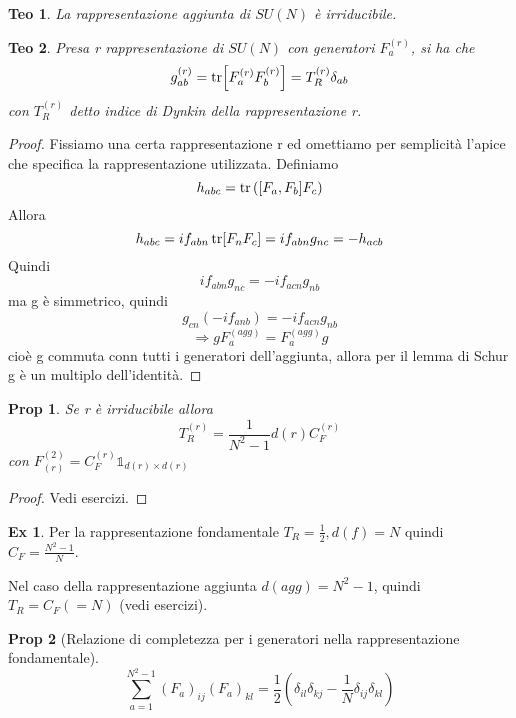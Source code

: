 \documentclass[10pt,a4paper]{article}
\newtheorem{thm}{Teo}[section]
\newtheorem{prop}{Prop}[section]
\theoremstyle{definition}
\newtheorem{example}{Ex}[section]
\begin{document}
\begin{thm}
    La rappresentazione aggiunta di $SU(N)$ è irriducibile.
\end{thm}

\begin{thm}
    Presa r rappresentazione di $SU(N)$ con generatori $F_a^{(r)}$, si ha che
    \[
    g_{ab}^{(r)} = \tr[F_a^{(r)}F_b^{(r)}] =T_R^{(r)}\delta_{ab}    
    \]
    con $T_R^{(r)}$ detto indice di Dynkin della rappresentazione r.
\end{thm}

\begin{proof}
    Fissiamo una certa rappresentazione r ed omettiamo per semplicità l'apice che specifica la rappresentazione utilizzata.
    Definiamo 
    \[
    h_{abc} = \tr\left( [F_a, F_b]F_c \right)    
    \]
    Allora
    \[
    h_{abc} = i f_{abn} \tr[F_n F_c] = i f_{abn}g_{nc} = - h_{acb}    
    \]
    Quindi
    \[
    i f_{abn} g_{nc} = - i f_{acn}g_{nb}    
    \]
    ma g è simmetrico, quindi
    \[
    g_{cn}(- i f_{anb}) = -i f_{acn}g_{nb}   
    \]
    \[
    \Rightarrow g F_a^{(agg)} = F_a^{(agg)}g    
    \]
    cioè g commuta conn tutti i generatori dell'aggiunta, allora per il lemma di Schur g è un multiplo dell'identità.

\end{proof}

\begin{prop}
    Se r è irriducibile allora
    \[
    T_R^{(r)} = \frac{1}{N^2 - 1}d(r)C_F^{(r)}    
    \]
    con \(F_{(r)}^{(2)} = C_F^{(r)}\mathbb{1}_{d(r)\times d(r)}\)
\end{prop}

\begin{proof}
    Vedi esercizi.

\end{proof}


\begin{example}
    Per la rappresentazione fondamentale \(T_R = \frac12, d(f) = N\) quindi $C_F = \frac{N^2 - 1}{N}$.

    Nel caso della rappresentazione aggiunta $d(agg) = N^2 - 1$, quindi $T_R = C_F ( = N)$ (vedi esercizi).
\end{example}

\begin{prop}[Relazione di completezza per i generatori nella rappresentazione fondamentale]
    \[\sum_{a = 1}^{N^2 - 1}(F_a)_{ij}(F_a)_{kl} = \frac12 (\delta_{il}\delta_{kj} - \frac1N \delta_{ij}\delta_{kl})\]
\end{prop}
\end{document}
